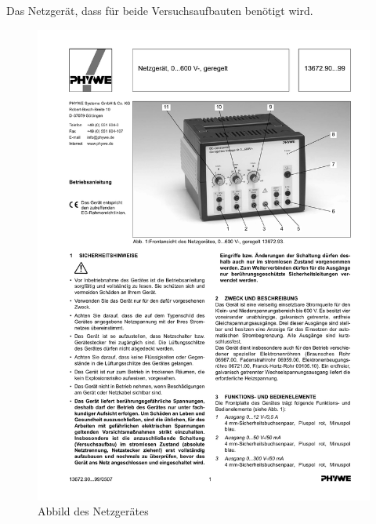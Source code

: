 \documentclass[12pt,a4paper]{article}
\begin{document}
Das Netzgerät, dass für beide Versuchsaufbauten benötigt wird.

\begin{figure}[H] 
  \centering
    \includegraphics[trim = 60mm 165mm 10mm 40mm, clip, scale = 1]{netzteil.pdf}
  	\caption[Abbild des Netzgerätes]{Abbild des Netzgerätes\footnotemark}
  \label{fig:aufbau_h}
\end{figure}
\end{document}
